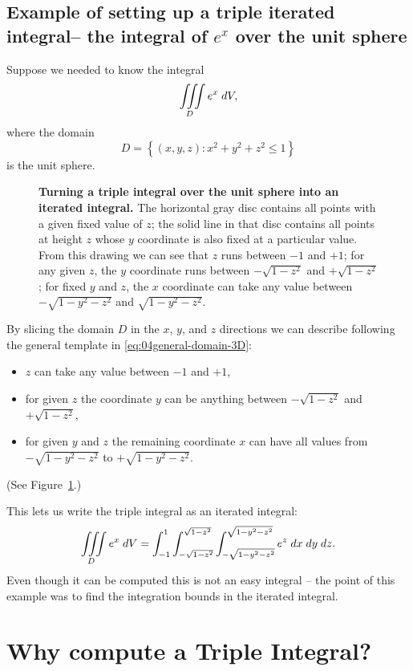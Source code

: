 \subsection{Example of setting up a triple iterated integral-- the integral of $e^x$ over the unit sphere}  
Suppose we needed to know the integral
\[
\iiint\limits_D e^x \; dV,
\]
where the domain
\[
D = \left\{ (x,y,z) : x^2+y^2+z^2 \le 1 \right\}
\]
is the unit sphere.
\begin{figure}[t]
  
  \caption{\textbf{Turning a triple integral over the unit sphere into
  an iterated integral. } The horizontal gray disc contains all points
  with a given fixed value of $z$; the solid line in that disc
  contains all points at height $z$ whose $y$ coordinate is also fixed
  at a particular value.  From this drawing we can see that $z$ runs
  between $-1$ and $+1$; for any given $z$, the $y$ coordinate runs
  between $-\sqrt{1-z^2}$ and $+\sqrt{1-z^2}$; for fixed $y$ and $z$,
  the $x$ coordinate can take any value between $-\sqrt{1-y^2-z^2}$ and
  $\sqrt{1-y^2-z^2}$.}
  \label{fig:04integral-over-sphere}
\end{figure}
By slicing the domain $D$ in the $x$, $y$, and $z$ directions we can describe following the general template in \eqref{eq:04general-domain-3D}:
\begin{itemize}

\item $z$ can take any value between $-1$ and $+1$, 

\item for given $z$ the coordinate $y$ can be anything between $-\sqrt{1-z^2}$ and $+\sqrt{1-z^2}$, 

\item for given $y$ and $z$ the remaining coordinate $x$ can have all values
from $-\sqrt{1-y^2-z^2}$ to $+\sqrt{1 - y^2 - z^2}$.

\end{itemize}
(See Figure~\ref{fig:04integral-over-sphere}.)

This lets us write the triple integral as an iterated integral:
\[
\iiint\limits_D e^x \; dV
=
\int_{-1}^1 \int_{-\sqrt{1-z^2}}^{\sqrt{1-z^2}}
\int_{-\sqrt{1-y^2-z^2}}^{\sqrt{1-y^2-z^2}}
e^z \; dx\; dy\; dz.
\]
Even though it can be computed this is not an easy integral -- the point of
this example was to find the integration bounds in the iterated
integral.

\section{Why compute a Triple Integral?}  

